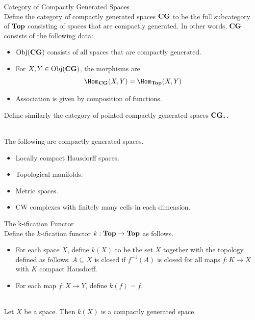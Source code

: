\documentclass[a4paper]{article}
\begin{document}
\begin{defn}{Category of Compactly Generated Spaces}{}\\
Define the category of compactly generated spaces $\bold{CG}$ to be the full subcategory of $\bold{Top}$ consisting of spaces that are compactly generated. In other words, $\bold{CG}$ consists of the following data: 
\begin{itemize}
\item $\text{Obj}(\bold{CG})$ consists of all spaces that are compactly generated. 
\item For $X,Y\in\text{Obj}(\bold{CG})$, the morphisms are $$\Hom_{\bold{CG}}(X,Y)=\Hom_{\bold{Top}}(X,Y)$$
\item Association is given by composition of functions. 
\end{itemize}
Define similarly the category of pointed compactly generated spaces $\bold{CG}_\ast$. 
\end{defn}

\begin{eg}{}{}\\
The following are compactly generated spaces. 
\begin{itemize}
\item Locally compact Hausdorff spaces. 
\item Topological manifolds. 
\item Metric spaces. 
\item CW complexes with finitely many cells in each dimension. 
\end{itemize}
\end{eg}

\begin{defn}{The k-ification Functor}{}\\
Define the $k$-ification functor $k:\bold{Top}\to\bold{Top}$ as follows. 
\begin{itemize}
\item For each space $X$, define $k(X)$ to be the set $X$ together with the topology defined as follows: $A\subseteq X$ is closed if $f^{-1}(A)$ is closed for all maps $f:K\to X$ with $K$ compact Hausdorff. 
\item For each map $f:X\to Y$, define $k(f)=f$. 
\end{itemize}
\end{defn}

\begin{lmm}{}{}\\
Let $X$ be a space. Then $k(X)$ is a compactly generated space. 
\end{lmm}
\end{document}
